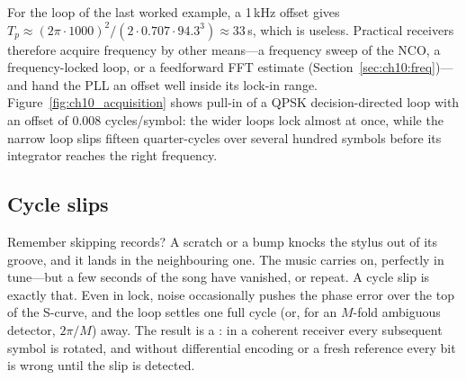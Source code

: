 For the loop of the last worked example, a 1\,kHz offset gives
$T_p\approx(2\pi\cdot1000)^2/(2\cdot0.707\cdot94.3^3)\approx33$\,s, which is useless. Practical receivers
therefore acquire frequency by other means---a frequency sweep of the NCO, a frequency-locked loop,
or a feedforward FFT estimate (Section~\ref{sec:ch10:freq})---and hand the PLL an offset well inside its
lock-in range. Figure~\ref{fig:ch10_acquisition} shows pull-in of a QPSK decision-directed loop with
an offset of 0.008 cycles/symbol: the wider loops lock almost at once, while the narrow loop slips
fifteen quarter-cycles over several hundred symbols before its integrator reaches the right
frequency.



\subsection{Cycle slips}

Remember skipping records? A scratch or a bump knocks the stylus out of its groove, and it
lands in the neighbouring one. The music carries on, perfectly in tune---but a few seconds of the
song have vanished, or repeat. A cycle slip is exactly that. Even in lock, noise occasionally
pushes the phase error over the top of the S-curve, and the loop settles one full cycle (or, for an
$M$-fold ambiguous detector, $2\pi/M$) away. The result is a : in a coherent
receiver every subsequent symbol is rotated, and without differential encoding or a fresh reference
every bit is wrong until the slip is detected.


